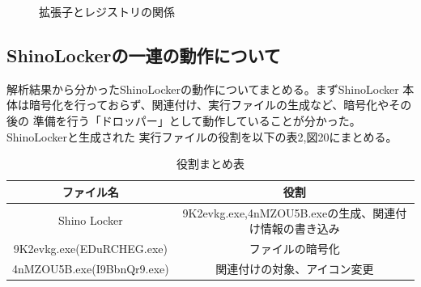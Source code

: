 \documentclass[dvipdfmx,autodetect-engine]{jsarticle}
\begin{document}
\begin{figure}[H]
  \centering
  \caption{拡張子とレジストリの関係}
\end{figure}

\subsection{ShinoLockerの一連の動作について}

解析結果から分かったShinoLockerの動作についてまとめる。まずShinoLocker
本体は暗号化を行っておらず、関連付け、実行ファイルの生成など、暗号化やその後の
準備を行う「ドロッパー」として動作していることが分かった。ShinoLockerと生成された
実行ファイルの役割を以下の表2,図20にまとめる。

\begin{table}[h]
  \caption{役割まとめ表}
  \begin{tabular}{|c|c|}
  \hline
  ファイル名                      & 役割                                                                  \\ \hline
  Shino Locker               & 9K2evkg.exe,4nMZOU5B.exeの生成、関連付け情報の書き込み \\ \hline
  9K2evkg.exe(EDuRCHEG.exe)  & ファイルの暗号化                                                            \\ \hline
  4nMZOU5B.exe(I9BbnQr9.exe) & 関連付けの対象、アイコン変更                                                      \\ \hline
  \end{tabular}
  \end{table}
  
\end{document}
